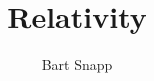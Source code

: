 \documentclass{ximera}
\title{Relativity}
\author{Bart Snapp}
\begin{document}
\begin{abstract}
\end{abstract}
\maketitle

\begin{image}
\end{image}
\end{document}
